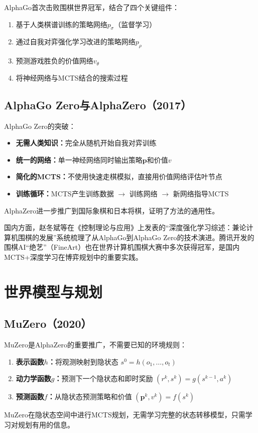AlphaGo首次击败围棋世界冠军，结合了四个关键组件：
\begin{enumerate}
  \item 基于人类棋谱训练的策略网络$p_\sigma$（监督学习）
  \item 通过自我对弈强化学习改进的策略网络$p_\rho$
  \item 预测游戏胜负的价值网络$v_\theta$
  \item 将神经网络与MCTS结合的搜索过程
\end{enumerate}

\subsection{AlphaGo Zero与AlphaZero（2017）}

\begin{keypoint}
AlphaGo Zero的突破：
\begin{itemize}
  \item \textbf{无需人类知识：}完全从随机开始自我对弈训练
  \item \textbf{统一的网络：}单一神经网络同时输出策略$\mathbf{p}$和价值$v$
  \item \textbf{简化的MCTS：}不使用快速走棋模拟，直接用价值网络评估叶节点
  \item \textbf{训练循环：}MCTS产生训练数据 $\rightarrow$ 训练网络 $\rightarrow$ 新网络指导MCTS
\end{itemize}
AlphaZero进一步推广到国际象棋和日本将棋，证明了方法的通用性。

国内方面，赵冬斌等在《控制理论与应用》上发表的``深度强化学习综述：兼论计算机围棋的发展''系统梳理了从AlphaGo到AlphaGo Zero的技术演进。腾讯开发的围棋AI``绝艺''（FineArt）也在世界计算机围棋大赛中多次获得冠军，是国内MCTS+深度学习在博弈规划中的重要实践。
\end{keypoint}

\section{世界模型与规划 \grad}

\subsection{MuZero（2020）}

MuZero是AlphaZero的重要推广，不需要已知的环境规则：

\begin{algbox}[title={\textbf{MuZero的三个学习函数}}]
\begin{enumerate}
  \item \textbf{表示函数$h$：}将观测映射到隐状态 $s^0 = h(o_1, \ldots, o_t)$
  \item \textbf{动力学函数$g$：}预测下一个隐状态和即时奖励 $(r^k, s^k) = g(s^{k-1}, a^k)$
  \item \textbf{预测函数$f$：}从隐状态预测策略和价值 $(\mathbf{p}^k, v^k) = f(s^k)$
\end{enumerate}
MuZero在隐状态空间中进行MCTS规划，无需学习完整的状态转移模型，只需学习对规划有用的信息。
\end{algbox}

